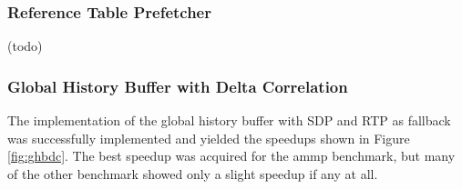 \subsubsection{Reference Table Prefetcher}
(todo)


\subsubsection{Global History Buffer with Delta Correlation}
The implementation of the global history buffer with SDP and RTP as fallback was successfully implemented and yielded the speedups shown in Figure \ref{fig:ghbdc}.
The best speedup was acquired for the ammp benchmark, but many of the other benchmark showed only a slight speedup if any at all.



\begin{figure*}
    \label{fig:ghbdc}
    
    \caption{Speedup of each benchmark as a function of degree for the global history buffer with delta correlation and fall back to SDP and RTP.}
\end{figure*}
